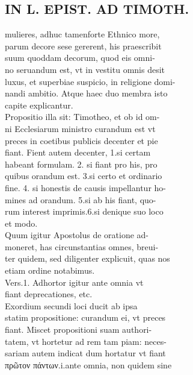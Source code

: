 \documentclass{article}
\begin{document}
\begin{pages}
\section*{IN L. EPIST. AD TIMOTH. \\
                }
mulieres, adhuc tamenforte Ethnico more, \\
                parum decore sese gererent, his praescribit \\
                suum quoddam decorum, quod eis omni- \\
                no seruandum est, vt in vestitu omnis desit \\
                luxus, et superbiae suspicio, in religione domi- \\
                nandi ambitio. Atque haec duo membra isto \\
                capite explicantur. \\
                Propositio illa sit: Timotheo, et ob id om- \\
                ni Ecclesiarum ministro curandum est vt \\
                preces in coetibus publicis decenter et pie \\
                fiant. Fient autem decenter, 1.si certam \\
                habeant formulam. 2. si fiant pro his, pro \\
                quibus orandum est. 3.si certo et ordinario \\
                fine. 4. si honestis de causis impellantur ho- \\
                mines ad orandum. 5.si ab his fiant, quo- \\
                rum interest imprimis.6.si denique suo loco \\
                et modo. \\
                Quum igitur Apostolus de oratione ad- \\
                moneret, has circunstantias omnes, breui- \\
                ter quidem, sed diligenter explicuit, quas nos \\
                etiam ordine notabimus. \\
                Vers.1. Adhortor igitur ante omnia vt \\
                fiant deprecationes, etc. \\
                Exordium secundi loci ducit ab ipsa \\
                statim propositione: curandum ei, vt preces \\
                fiant. Miscet propositioni suam authori- \\
                tatem, vt hortetur ad rem tam piam: neces- \\
                sariam autem indicat dum hortatur vt fiant \\
                πρῶτον πάντων.i.ante omnia, non quidem sine \\
                

\end{pages}
\end{document}
